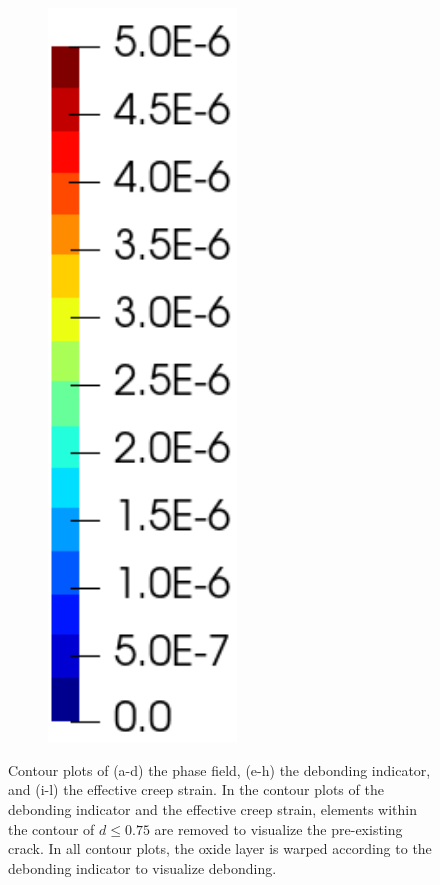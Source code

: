 \begin{figure}[!htb]
\begin{subfigure}[b]{0.1\textwidth}
    \includegraphics[width=0.55\textwidth]{Chapter5/figures/spallation/colorbar_ep}
    \vspace{3em}
  \end{subfigure}
  \caption{Contour plots of (a-d) the phase field, (e-h) the debonding indicator, and (i-l) the effective creep strain. In the contour plots of the debonding indicator and the effective creep strain, elements within the contour of $d \leqslant 0.75$ are removed to visualize the pre-existing crack. In all contour plots, the oxide layer is warped according to the debonding indicator to visualize debonding. }
  \label{fig: Chapter5/spallation/animation_seed}
\end{figure}
